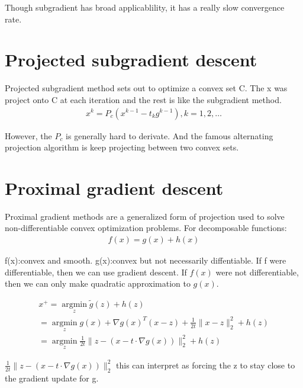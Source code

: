 \documentclass[aps,letterpaper,10pt]{article}
\begin{document}
Though subgradient has broad applicablility, it has a really slow convergence rate.\vspace{3mm}


\section{Projected subgradient descent}

Projected subgradient method sets out to optimize a convex set C. The x was project onto C at each iteration and the rest is like the subgradient method.
\begin{align*}
  x^{k} = P_c(x^{k-1}-t_kg^{k-1}),k =1,2,\dots
\end{align*}

However, the $P_c$ is generally hard to derivate. And the famous alternating projection algorithm is keep projecting between two convex sets.\vspace{3mm}

\section{Proximal gradient descent}
Proximal gradient methods are a generalized form of projection used to solve non-differentiable convex optimization problems. For decomposable functions:
\begin{align*}
f(x)=g(x)+h(x)
\end{align*}

f(x):convex and smooth. g(x):convex but not necessarily diffentiable. If f were differentiable, then we can use gradient descent. If $f(x)$ were not differentiable, then we can only make quadratic approximation to $g(x)$.\vspace{3mm}

\begin{align*}
x ^ { + } = \underset { z } { \operatorname { argmin } } \tilde { g } ( z ) + h ( z )\\
= \underset { z } { \operatorname { argmin } } g ( x ) + \nabla g ( x ) ^ { T } ( x - z ) + \frac { 1 } { 2 t } \| x - z \| _ { 2 } ^ { 2 } + h ( z )\\
=\underset { z } { \operatorname { argmin } } \frac { 1 } { 2 t } \| z - ( x - t \cdot \nabla g ( x ) ) \| _ { 2 } ^ { 2 } + h ( z )
\end{align*}

$\frac { 1 } { 2 t } \| z - ( x - t \cdot \nabla g ( x ) ) \| _ { 2 } ^ { 2 }$ this can interpret as forcing the z to stay close to the gradient update for g.\vspace{3mm}
\end{document}
